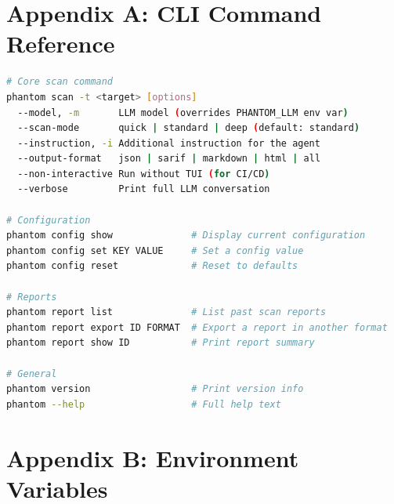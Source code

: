 \documentclass[12pt,a4paper]{article}
\begin{document}
\newpage
\appendix
\section*{Appendix A: CLI Command Reference}

\begin{lstlisting}[language=bash, caption={Complete CLI usage}]
# Core scan command
phantom scan -t <target> [options]
  --model, -m       LLM model (overrides PHANTOM_LLM env var)
  --scan-mode       quick | standard | deep (default: standard)
  --instruction, -i Additional instruction for the agent
  --output-format   json | sarif | markdown | html | all
  --non-interactive Run without TUI (for CI/CD)
  --verbose         Print full LLM conversation

# Configuration
phantom config show              # Display current configuration
phantom config set KEY VALUE     # Set a config value
phantom config reset             # Reset to defaults

# Reports
phantom report list              # List past scan reports
phantom report export ID FORMAT  # Export a report in another format
phantom report show ID           # Print report summary

# General
phantom version                  # Print version info
phantom --help                   # Full help text
\end{lstlisting}

\section*{Appendix B: Environment Variables}
\end{document}
